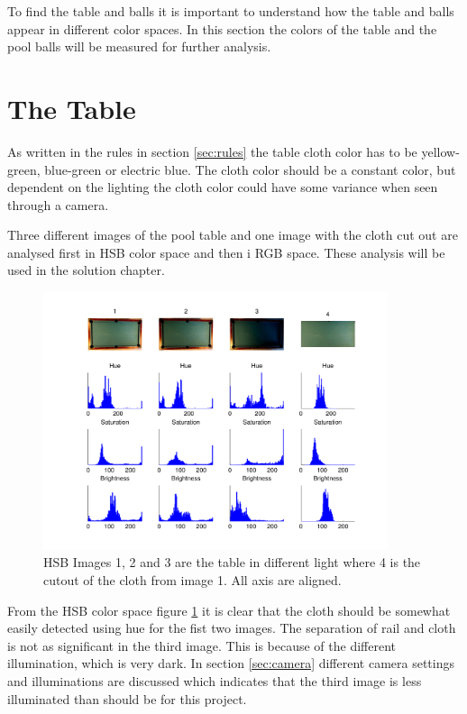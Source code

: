 To find the table and balls it is important to understand how the table and balls appear in different color spaces. In this section the colors of the table and the pool balls will be measured for further analysis.

\section{The Table}
As written in the rules in section \ref{sec:rules} the table cloth color has to be yellow-green, blue-green or electric blue. The cloth color should be a constant color, but dependent on the lighting the cloth color could have some variance when seen through a camera.

Three different images of the pool table and one image with the cloth cut out are analysed first in HSB color space and then i RGB space. These analysis will be used in the solution chapter.

\begin{figure}[H]
\begin{center}
\leavevmode
\includegraphics[width=0.9\textwidth]{images/hsv_hist_table}
\end{center}
\caption{HSB Images 1, 2 and 3 are the table in different light where 4 is the cutout of the cloth from image 1. All axis are aligned.}
\label{fig:tablehsv}
\end{figure} 

From the HSB color space figure \ref{fig:tablehsv} it is clear that the cloth should be somewhat easily detected using hue for the fist two images. The separation of rail and cloth is not as significant in the third image. This is because of the different illumination, which is very dark. In section \ref{sec:camera} different camera settings and illuminations are discussed which indicates that the third image is less illuminated than should be for this project.

